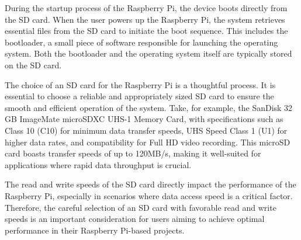 During the startup process of the Raspberry Pi, the device boots
directly from the SD card. When the user powers up the Raspberry Pi, the
system retrieves essential files from the SD card to initiate the boot
sequence. This includes the bootloader, a small piece of software
responsible for launching the operating system. Both the bootloader and
the operating system itself are typically stored on the SD card.

The choice of an SD card for the Raspberry Pi is a thoughtful process.
It is essential to choose a reliable and appropriately sized SD card to
ensure the smooth and efficient operation of the system. Take, for
example, the SanDisk 32 GB ImageMate microSDXC UHS-1 Memory Card, with
specifications such as Class 10 (C10) for minimum data transfer speeds,
UHS Speed Class 1 (U1) for higher data rates, and compatibility for Full
HD video recording. This microSD card boasts transfer speeds of up to
120MB/s, making it well-suited for applications where rapid data
throughput is crucial.

The read and write speeds of the SD card directly impact the performance
of the Raspberry Pi, especially in scenarios where data access speed is
a critical factor. Therefore, the careful selection of an SD card with
favorable read and write speeds is an important consideration for users
aiming to achieve optimal performance in their Raspberry Pi-based
projects.